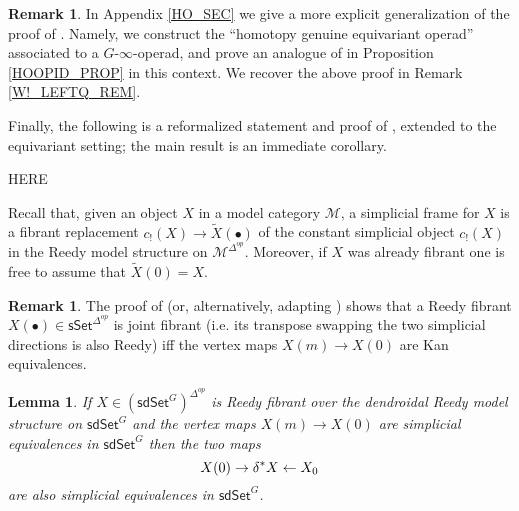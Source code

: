 \documentclass[a4paper,10pt
,draft
]{article}%
\numberwithin{equation}{section}
\numberwithin{figure}{section}
\newtheorem{lemma}[equation]{Lemma}%
\theoremstyle{definition} %
\newtheorem{remark}[equation]{Remark}%
\newcommand{\1}{\ensuremath{\mathbbm 1}}%
\begin{document}
\begin{remark}
      In Appendix \ref{HO_SEC} we give a more explicit generalization of the proof of \cite[Prop. 4.9]{CM13b}.
      Namely, we construct the ``homotopy genuine equivariant operad'' associated to a $G$-$\infty$-operad,
      and prove an analogue of \cite[Prop. 4.8]{CM13b} in Proposition \ref{HOOPID_PROP} in this context.
      We recover the above proof in Remark \ref{W!_LEFTQ_REM}.
\end{remark}








Finally, the following is a reformalized statement and proof of \cite[Thm. 8.14]{CM13b}, extended to the equivariant setting;
the main result is an immediate corollary.







{\color{red} HERE}


Recall that, given an object $X$ in a model category $\mathcal{M}$,
a simplicial frame for $X$ is a fibrant replacement
$c_!(X) \to \widetilde{X}(\bullet)$ of the constant 
simplicial object $c_!(X)$ in the Reedy model structure on $\mathcal{M}^{\Delta^{op}}$.
Moreover, if $X$ was already fibrant one is free to assume that $\widetilde{X}(0) = X$.

\begin{remark}\label{JOINTFIB REM}
	The proof of \cite[Prop. 4.5(ii)]{BP_edss}
	(or, alternatively, adapting \cite[Prop. 4.24(ii)]{BP_edss})
	shows that a Reedy fibrant $X(\bullet) \in \mathsf{sSet}^{\Delta^{op}}$
	is joint fibrant (i.e. its transpose swapping the two simplicial directions is also Reedy)
	iff the vertex maps $X(m) \to X(0)$
	are Kan equivalences.
\end{remark}

\begin{lemma}\label{DIAGWE LEM}
If $X \in (\mathsf{sdSet}^G)^{\Delta^{op}}$ is
Reedy fibrant 
over the dendroidal Reedy model structure 
on $\mathsf{sdSet}^G$
and the vertex maps 
$X(m) \to X(0)$ are simplicial equivalences in $\mathsf{sdSet}^G$
then the two maps
\[
X(0) \to \delta^{\**} X \leftarrow X_0
\]
are also simplicial equivalences in $\mathsf{sdSet}^G$.
\end{lemma}
\end{document}
